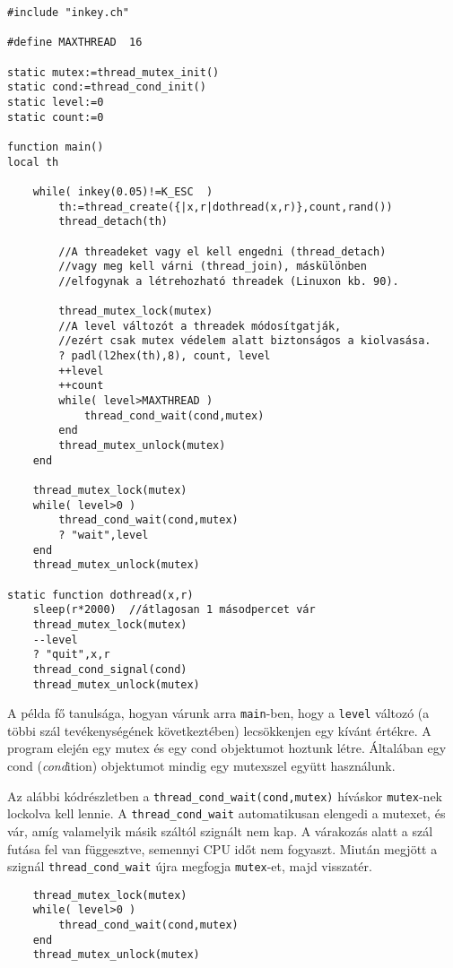 \begin{verbatim}
#include "inkey.ch"

#define MAXTHREAD  16

static mutex:=thread_mutex_init()
static cond:=thread_cond_init()
static level:=0
static count:=0

function main()
local th

    while( inkey(0.05)!=K_ESC  )
        th:=thread_create({|x,r|dothread(x,r)},count,rand())
        thread_detach(th)
        
        //A threadeket vagy el kell engedni (thread_detach)
        //vagy meg kell várni (thread_join), máskülönben
        //elfogynak a létrehozható threadek (Linuxon kb. 90).

        thread_mutex_lock(mutex)
        //A level változót a threadek módosítgatják,
        //ezért csak mutex védelem alatt biztonságos a kiolvasása.
        ? padl(l2hex(th),8), count, level
        ++level
        ++count
        while( level>MAXTHREAD )
            thread_cond_wait(cond,mutex)
        end
        thread_mutex_unlock(mutex)
    end

    thread_mutex_lock(mutex)
    while( level>0 )
        thread_cond_wait(cond,mutex)
        ? "wait",level
    end
    thread_mutex_unlock(mutex)

static function dothread(x,r)
    sleep(r*2000)  //átlagosan 1 másodpercet vár
    thread_mutex_lock(mutex)
    --level
    ? "quit",x,r
    thread_cond_signal(cond)
    thread_mutex_unlock(mutex)
\end{verbatim}


A példa fő tanulsága, 
hogyan várunk arra \verb!main!-ben, hogy a \verb!level! változó 
(a többi szál tevékenységének következtében)
lecsökkenjen egy kívánt értékre.
A program elején egy mutex és egy cond objektumot hoztunk létre.
Általában egy cond ({\em cond\/}ition) objektumot mindig egy mutexszel együtt használunk.


Az alábbi kódrészletben a \verb!thread_cond_wait(cond,mutex)!
híváskor \verb!mutex!-nek lockolva kell lennie. A \verb!thread_cond_wait!
automatikusan elengedi a mutexet, és vár, amíg valamelyik másik száltól szignált
nem kap. A várakozás alatt a szál futása fel van függesztve, semennyi CPU időt 
nem fogyaszt. Miután megjött a szignál
\verb!thread_cond_wait! újra megfogja \verb!mutex!-et, majd visszatér.
\begin{verbatim}
    thread_mutex_lock(mutex)
    while( level>0 )
        thread_cond_wait(cond,mutex)
    end
    thread_mutex_unlock(mutex)
\end{verbatim}

